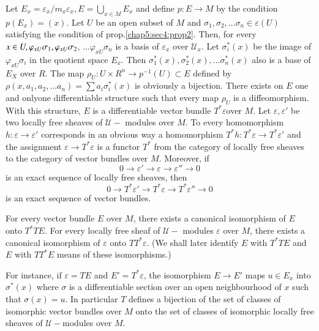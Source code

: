 Let $E_x = \varepsilon_x / m_x \varepsilon_x, E = \bigcup \limits_{x
  \in M} E_x$ and define $p : E \to M$ by the condition $p(E_x) =
(x)$. Let $U$ be an open subset of $M$ and $\sigma_1, \sigma_2, \ldots
\sigma_n \in \varepsilon (U)$ satisfying the condition of
prop.\ref{chap5:sec4:prop2}. Then, for every $x \in U, \varphi_{xU} \sigma_1,\break
\varphi_{xU} \sigma_2$, $\ldots \varphi_{xU} \sigma_n$ is a basis of
$\varepsilon_x$ over $\mathscr{U}_x$. Let $\sigma^*_i (x)$ be the
image of $\varphi_{xU} \sigma_i$ in the quotient space $E_x$. 
Then $\sigma^*_1 (x), \sigma^*_2 (x), \ldots \sigma^*_n (x)$ also is a
base of $E_X$ over $R$. The map $\rho_U : U \times R^n \to p^{-1}(U)
\subset E$ defined by $\rho(x, a_1, a_2, \ldots a_n)= \sum a_i
\sigma^*_i (x)$ is obviously a bijection. There exists on $E$ one and
only\pageoriginale one differentiable structure such that every map $\rho_U$ is a
diffeomorphism. With this structure, $E$ is a differentiable vector
bundle $T^* \varepsilon$over $M$. Let $\varepsilon, \varepsilon'$ be
two locally free sheaves of $\mathscr{U}-$ modules over $M$. To every
homomorphism $h : \varepsilon \to \varepsilon'$ corresponds in an
obvious way a homomorphism $T^* h :T^*\varepsilon \to T^* \varepsilon'$
and the assignment $\varepsilon \to T^*\varepsilon$ is a functor $T^*$
from the category of locally free sheaves to the category of vector
bundles over $M$. Moreover, if 
$$
0 \to \varepsilon' \to \varepsilon \to \varepsilon'' \to 0
$$
is an exact sequence of locally free sheaves, then  
$$
0 \to T^* \varepsilon'\to T^*\varepsilon \to T^*\varepsilon'' \to 0
$$ 
is an exact sequence of vector bundles.

\begin{proposition}\label{chap5:sec4:prop3}%
  For  every vector bundle $E$ over $M$, there exists a canonical
  isomorphism of $E$ onto $T^*T E$. For every locally free sheaf of
  $\mathscr{U}-$ modules $\varepsilon$ over $M$, there exists a
  canonical isomorphism of $\varepsilon$ onto $TT^* \varepsilon$. (We
  shall later identify $E$ with $T^*TE$ and $E$ with $TT^*E$ means of
  these isomorphisms.) 
\end{proposition}

For instance, if $\varepsilon = TE$ and $E' =T^* \varepsilon$, the
isomorphism $E \to E'$ maps $u \in E_x$ into $\sigma^* (x)$ where
$\sigma$ is a differentiable section over an open neighbourhood of $x$
such that $\sigma(x) = u$. In particular $T$ defines a bijection of
the set of classes of isomorphic vector bundles over $M$ onto the set
of classes of isomorphic locally free sheaves of $\mathscr{U}-$modules
over $M$. 

